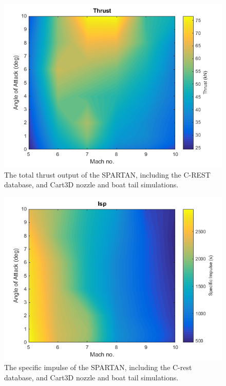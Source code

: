 \begin{figure}[ht]
	\centering
	\includegraphics[width=0.6\linewidth]{figures/3_vehicle_design/Thrust}
	\caption{The total thrust output of the SPARTAN, including the C-REST database, and Cart3D nozzle and boat tail simulations.}
	\label{fig:Thrust}
\end{figure}

\begin{figure}[ht]
	\centering
	\includegraphics[width=0.6\linewidth]{figures/3_vehicle_design/Isp}
	\caption{The specific impulse of the SPARTAN, including the C-rest database, and Cart3D nozzle and boat tail simulations.}
	\label{fig:Isp}
\end{figure}


		
		
		
		
		
		

